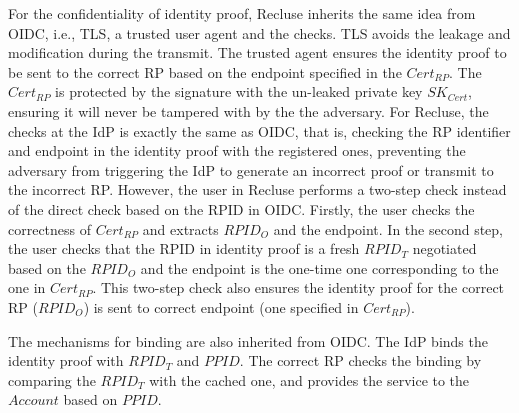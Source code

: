 For the confidentiality of identity proof, Recluse inherits the same idea from OIDC, i.e., TLS, a trusted user agent and the checks. TLS avoids the leakage and modification during the transmit. The trusted agent ensures the identity proof to be sent to the correct RP based on the endpoint specified in the $Cert_{RP}$. The  $Cert_{RP}$ is protected by the signature with the un-leaked private key $SK_{Cert}$, ensuring it  will never be tampered with by the the adversary. For Recluse, the checks at the IdP is exactly the same as OIDC, that is, checking the RP identifier and endpoint in the identity proof with the registered ones, preventing the adversary from triggering the IdP to
generate an incorrect proof or transmit to the incorrect RP. However, the user in Recluse performs a two-step check instead of the direct check based on the RPID in OIDC. Firstly, the user checks the correctness of $Cert_{RP}$ and extracts  $RPID_O$ and the endpoint. In the second step, the user checks that the RPID in identity proof is a fresh $RPID_T$ negotiated based on the $RPID_O$ and the endpoint is the one-time one corresponding to the one in $Cert_{RP}$. This two-step check also ensures the identity proof for the correct RP ($RPID_O$) is sent to correct endpoint (one specified in $Cert_{RP}$).

The mechanisms for binding are also inherited from OIDC. The IdP binds the identity proof with $RPID_{T}$ and $PPID$. The correct RP checks the binding by comparing the $RPID_T$ with the cached one, and provides the service  to the $Account$ based on $PPID$.

